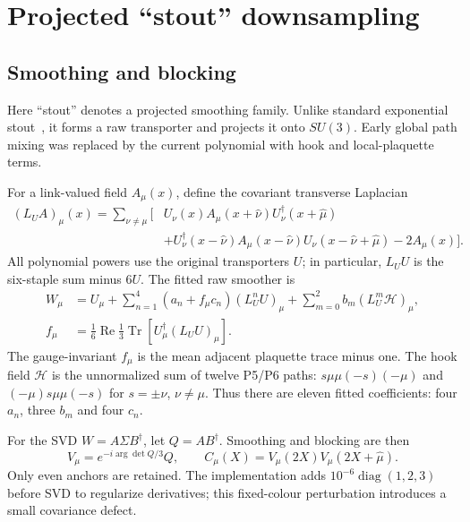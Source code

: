\documentclass[aps,prd,superscriptaddress,nofootinbib,eqsecnum,floatfix,amsmath,longbibliography]{revtex4-2}
\newcommand{\Tr}{\operatorname{Tr}}
\newcommand{\SU}{SU(3)}
\begin{document}
\section{Projected ``stout'' downsampling}
\subsection{Smoothing and blocking}
Here ``stout'' denotes a projected smoothing family. Unlike standard
exponential stout~\cite{morningstar}, it forms a raw transporter and
projects it onto $\SU$. Early global path mixing was replaced by the
current polynomial with hook and local-plaquette terms.

For a link-valued field $A_\mu(x)$, define the covariant transverse Laplacian
\begin{align}
 (L_UA)_\mu(x)=\sum_{\nu\ne\mu}\big[&
 U_\nu(x)A_\mu(x+\hat\nu)U_\nu^\dagger(x+\hat\mu)\nonumber\\
 &+U_\nu^\dagger(x-\hat\nu)A_\mu(x-\hat\nu)
 U_\nu(x-\hat\nu+\hat\mu)-2A_\mu(x)\big].
\end{align}
All polynomial powers use the original transporters $U$; in particular,
$L_UU$ is the six-staple sum minus $6U$. The fitted raw smoother is
\begin{align}
 W_\mu&=U_\mu+\sum_{n=1}^4(a_n+f_\mu c_n)(L_U^nU)_\mu
                  +\sum_{m=0}^2b_m(L_U^m\mathcal H)_\mu,\\
 f_\mu&=\frac16\operatorname{Re}\frac13
                   \Tr[U_\mu^\dagger(L_UU)_\mu].
\end{align}
The gauge-invariant $f_\mu$ is the mean adjacent plaquette trace minus one.
The hook field $\mathcal H$ is the unnormalized sum of twelve P5/P6 paths:
$s\mu\mu(-s)(-\mu)$ and $(-\mu)s\mu\mu(-s)$ for $s=\pm\nu$, $\nu\ne\mu$.
Thus there are eleven fitted coefficients: four $a_n$, three $b_m$ and
four $c_n$.

For the SVD $W=A\Sigma B^\dagger$, let $Q=AB^\dagger$. Smoothing and
blocking are then
\begin{equation}
 V_\mu=e^{-i\arg\det Q/3}Q,\qquad
 C_\mu(X)=V_\mu(2X)V_\mu(2X+\hat\mu).
 \label{eq:block}
\end{equation}
Only even anchors are retained. The implementation adds
$10^{-6}\operatorname{diag}(1,2,3)$ before SVD to regularize derivatives;
this fixed-colour perturbation introduces a small covariance defect.
\end{document}

